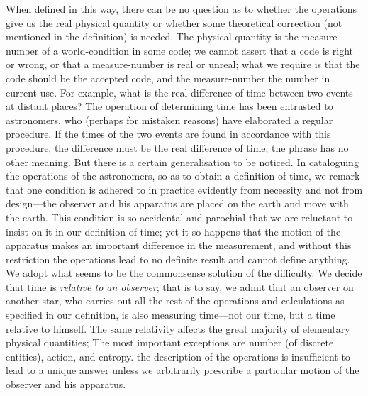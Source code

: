 \documentclass[12pt]{book}
\begin{document}
When defined in this way, there can be no question as to whether the
operations give us the real physical quantity or whether some theoretical
correction (not mentioned in the definition) is needed. The physical quantity
is the measure\hyp{}number of a world\hyp{}condition in some code; we cannot assert
that a code is right or wrong, or that a measure\hyp{}number is real or unreal;
what we require is that the code should be the accepted code, and the measure\hyp{}number
the number in current use. For example, what is the real difference
of time between two events at distant places? The operation of determining
time has been entrusted to astronomers, who (perhaps for mistaken reasons)
have elaborated a regular procedure. If the times of the two events are found
in accordance with this procedure, the difference must be the real difference
of time; the phrase has no other meaning. But there is a certain generalisation
to be noticed. In cataloguing the operations of the astronomers, so as to
obtain a definition of time, we remark that one condition is adhered to in
practice evidently from necessity and not from design---the observer and his
apparatus are placed on the earth and move with the earth. This condition
is so accidental and parochial that we are reluctant to insist on it in our
definition of time; yet it so happens that the motion of the apparatus makes
an important difference in the measurement, and without this restriction the
operations lead to no definite result and cannot define anything. We adopt
what seems to be the commonsense solution of the difficulty. We decide that
time is \emph{relative to an observer}; that is to say, we admit that an observer on
another star, who carries out all the rest of the operations and calculations
as specified in our definition, is also measuring time---not our time, but a
time relative to himself. The same relativity affects the great majority of
elementary physical quantities\footnotemark;\footnotetext
  {The most important exceptions are number (of discrete entities), action, and entropy.}
the description of the operations is insufficient
to lead to a unique answer unless we arbitrarily prescribe a particular
motion of the observer and his apparatus.
\end{document}
